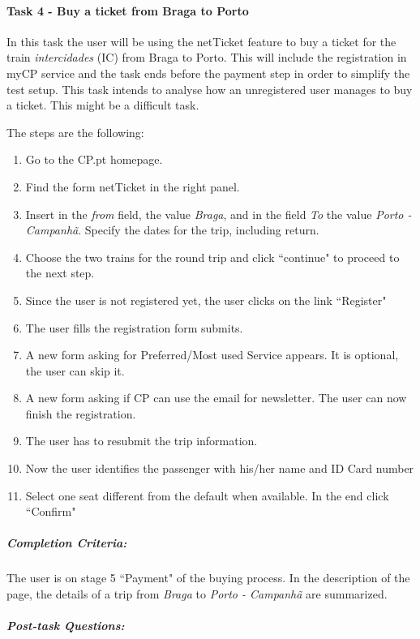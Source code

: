 \documentclass[a4paper]{article}
\begin{document}
\paragraph{Task 4 - Buy a ticket from Braga to Porto}
In this task the user will be using the netTicket feature to buy a ticket for the train \emph{intercidades} (IC) from Braga to Porto. This will include the registration in myCP service and the task ends before the payment step in order to simplify the test setup. This task intends to analyse how an unregistered user manages to buy a ticket. This might be a difficult task.

The steps are the following:

\begin{enumerate}[label=\roman*.]
  \item Go to the CP.pt homepage.
  \item Find the form netTicket in the right panel.
  \item Insert in the \emph{from} field, the value \emph{Braga}, and in the field \emph{To} the value \emph{Porto - Campanhã}. Specify the dates for the trip, including return.
  \item Choose the two trains for the round trip and click ``continue" to proceed to the next step.
  \item Since the user is not registered yet, the user clicks on the link ``Register"
  \item The user fills the registration form submits.
  \item A new form asking for Preferred/Most used Service appears. It is optional, the user can skip it.
  \item A new form asking if CP can use the email for newsletter. The user can now finish the registration.
  \item The user has to resubmit the trip information.
  \item Now the user identifies the passenger with his/her name and ID Card number
  \item Select one seat different from the default when available. In the end click ``Confirm"
\end{enumerate}

\subparagraph{Completion Criteria:} The user is on stage 5 ``Payment" of the buying process. In the description of the page, the details of a trip from \textit{Braga} to \textit{Porto - Campanhã} are summarized.

\subparagraph{Post-task Questions:}
\end{document}
